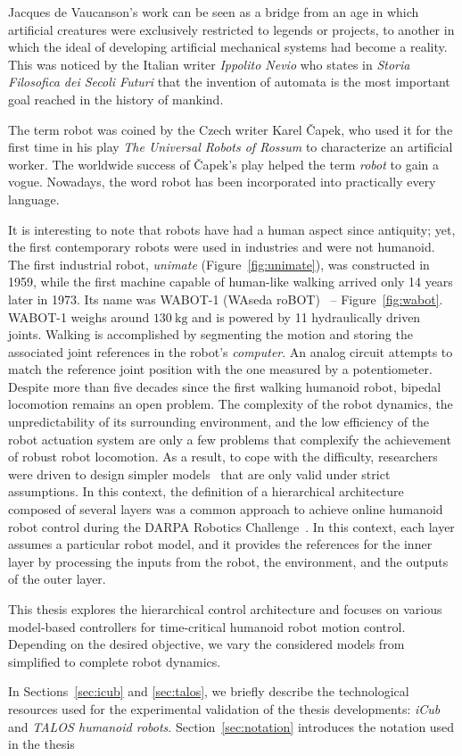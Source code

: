 Jacques de Vaucanson's work can be seen as a bridge from an age in which artificial creatures were exclusively restricted to legends or projects, to another in which the ideal of developing artificial mechanical systems had become a reality.
This was noticed by the Italian writer \emph{Ippolito Nevio} who states in \emph{Storia Filosofica dei Secoli Futuri} that the invention of automata is the most important goal reached in the history of mankind.
\par
The term robot was coined by the Czech writer Karel Čapek, who used it for the first time in his play \emph{The Universal Robots of Rossum} to characterize an artificial worker. The worldwide success of Čapek's play helped the term \emph{robot} to gain a vogue. Nowadays, the word robot has been incorporated into practically every language.
\par
It is interesting to note that robots have had a human aspect since antiquity; yet, the first contemporary robots were used in industries and were not humanoid. The first industrial robot, \emph{unimate} (Figure~\ref{fig:unimate}), was constructed in 1959, while the first machine capable of human-like walking arrived only 14 years later in 1973. Its name was WABOT-1 (WAseda roBOT)~\citep{Takanishi2019HistoricalAsia} -- Figure~\ref{fig:wabot}. WABOT-1 weighs around $\SI{130}{\kilo \gram}$ and is powered by 11 hydraulically driven joints. Walking is accomplished by segmenting the motion and storing the associated joint references in the robot's \emph{computer}. An analog circuit attempts to match the reference joint position with the one measured by a potentiometer. Despite more than five decades since the first walking humanoid robot, bipedal locomotion remains an open problem. The complexity of the robot dynamics, the unpredictability of its surrounding environment, and the low efficiency of the robot actuation system are only a few problems that complexify the achievement of robust robot locomotion. As a result, to cope with the difficulty, researchers were driven to design simpler models~\citep{Kajita2001,vukobratovic2004zero,Pratt2006,Englsberger2011} that are only valid under strict assumptions. In this context, the definition of a hierarchical architecture composed of several layers was a common approach to achieve online humanoid robot control during the DARPA Robotics Challenge~\citep{Spenko2018TheRescue}. In this context, each layer assumes a particular robot model, and it provides the references for the inner layer by processing the inputs from the robot, the environment, and the outputs of the outer layer.
\par
This thesis explores the hierarchical control architecture and focuses on various model-based controllers for time-critical humanoid robot motion control. Depending on the desired objective, we vary the considered models from simplified to complete robot dynamics.
\par
In Sections~\ref{sec:icub} and \ref{sec:talos}, we briefly describe the technological resources used for the experimental validation of the thesis developments: \emph{iCub} and \emph{TALOS humanoid robots}. Section~\ref{sec:notation} introduces the notation used in the thesis 




